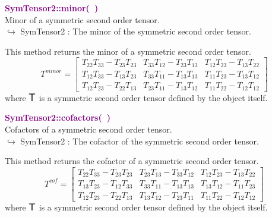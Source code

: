 \textcolor{purple}{\textbf{SymTensor2::minor(~)}}\label{SymTensor2::minor()}\\
Minor of a symmetric second order tensor.\\ \hspace*{10mm}$\hookrightarrow$ SymTensor2 : The minor of the symmetric second order tensor.

This method returns the minor of a symmetric second order tensor.
\begin{equation*}
T^{minor} = \left[\begin{array}{ccc}
T_{22}T_{33}-T_{23}T_{23} & T_{33}T_{12}-T_{23}T_{13} & T_{12}T_{23}-T_{13}T_{22}\\
T_{12}T_{33}-T_{13}T_{23} & T_{33}T_{11}-T_{13}T_{13} & T_{11}T_{23}-T_{13}T_{12}\\
T_{12}T_{23}-T_{22}T_{13} & T_{23}T_{11}-T_{13}T_{12} & T_{11}T_{22}-T_{12}T_{12}
\end{array}
\right]
\end{equation*}
where $\mbox{\large\ensuremath{\mathsf{T}}}$ is a symmetric second order tensor defined by the object itself.

\textcolor{purple}{\textbf{SymTensor2::cofactors(~)}}\label{SymTensor2::cofactors()}\\
Cofactors of a symmetric second order tensor.\\ \hspace*{10mm}$\hookrightarrow$ SymTensor2 : The cofactor of the symmetric second order tensor.

This method returns the cofactor of a symmetric second order tensor.
\begin{equation*}
T^{cof} = \left[\begin{array}{ccc}
T_{22}T_{33}-T_{23}T_{23} & T_{23}T_{13}-T_{33}T_{12} & T_{12}T_{23}-T_{13}T_{22}\\
T_{13}T_{23}-T_{12}T_{33} & T_{33}T_{11}-T_{13}T_{13} & T_{13}T_{12}-T_{11}T_{23}\\
T_{12}T_{23}-T_{22}T_{13} & T_{13}T_{12}-T_{23}T_{11} & T_{11}T_{22}-T_{12}T_{12}
\end{array}
\right]
\end{equation*}
where $\mbox{\large\ensuremath{\mathsf{T}}}$ is a symmetric second order tensor defined by the object itself.

